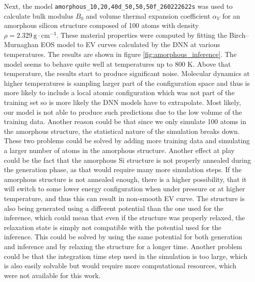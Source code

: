 Next, the model \texttt{amorphous\_10,20,40d\_50,50,50f\_260222622s} was used
to calculate bulk modulus $B_0$ and volume thermal expansion coefficient
$\alpha_{V}$ for an amorphous silicon structure composed of 100 atoms with
density $\rho = 2.329 \, \mathrm{g} \cdot \mathrm{cm}^{-3}$. These material
properties were computed by fitting the Birch--Murnaghan EOS model to EV
curves calculated by the DNN at various temperatures. The results are shown in
figure \ref{fig:amorphous_inference}. The model seems to behave quite well at
temperatures up to 800 K. Above that temperature, the results start to produce
significant noise. Molecular dynamics at higher temperatures is sampling larger
part of the configuration space and thus is more likely to include a local
atomic configuration which was not part of the training set so is more likely
the DNN models have to extrapolate. Most likely, our model is not able to
produce such predictions due to the low volume of the training data. Another
reason could be that since we only simulate 100 atoms in the amorphous
structure, the statistical nature of the simulation breaks down. These two
problems could be solved by adding more training data and simulating a larger
number of atoms in the amorphous structure. Another effect at play could be
the fact that the amorphous Si structure is not properly annealed during the
generation phase, as that would require many more simulation steps.
If the amorphous structure is not annealed enough, there is a higher possibility, that it will switch to some lower energy configuration when under pressure or at higher temperature, and thus this can result in non-smooth EV curve.
The structure is also being generated using a different potential than the one
used for the inference, which could mean that even if the structure was
properly relaxed, the relaxation state is simply not compatible with the potential used for the inference. This could be
solved by using the same potential for both generation and inference and
by relaxing the structure for a longer time. Another problem could be that the
integration time step used in the simulation is too large, which is also easily
solvable but would require more computational resources, which were not
available for this work.

